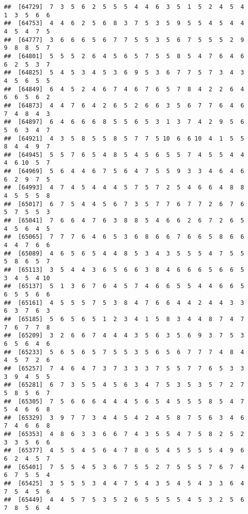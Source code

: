 \documentclass[
]{book}
\begin{document}
\begin{verbatim}
##  [64729]  7  3  5  6  2  5  5  5  4  4  6  3  5  1  5  2  4  5  4  1  3  5  6  6
##  [64753]  4  4  6  2  5  6  8  3  7  5  3  5  9  5  5  4  5  4  4  4  5  4  7  5
##  [64777]  3  6  6  6  5  6  7  7  5  5  3  5  6  7  5  5  5  2  9  9  8  8  5  7
##  [64801]  5  5  5  2  6  4  5  6  5  7  5  5  8  5  4  7  6  4  6  6  2  5  3  7
##  [64825]  5  4  5  3  4  5  3  6  9  5  3  6  7  7  5  7  3  4  3  4  5  6  5  5
##  [64849]  6  4  5  2  4  6  7  4  6  7  6  5  7  8  4  2  2  6  4  6  6  5  6  2
##  [64873]  4  4  7  6  4  2  6  5  2  6  6  3  5  6  7  7  6  4  6  7  4  8  4  3
##  [64897]  6  4  6  6  6  8  5  5  6  5  3  1  3  7  4  2  9  5  6  5  6  3  4  7
##  [64921]  4  3  5  8  5  5  8  5  7  7  5 10  6  6 10  4  1  5  5  8  4  4  9  7
##  [64945]  5  5  7  6  5  4  8  5  4  5  6  5  5  7  4  5  5  4  4  4  6 10  5  7
##  [64969]  5  6  4  4  6  7  5  6  4  7  5  5  9  3  3  4  6  4  6  6  2  9  7  5
##  [64993]  4  7  4  5  4  4  4  5  7  5  7  2  5  4  6  6  4  8  8  4  5  5  5  8
##  [65017]  6  7  5  4  4  5  6  7  3  5  7  7  6  7  7  2  6  7  6  5  7  5  5  3
##  [65041]  7  6  6  4  7  6  3  8  8  5  4  6  6  2  6  7  2  6  5  4  5  6  4  5
##  [65065]  7  7  7  6  4  6  5  3  6  8  6  6  7  6  6  5  8  6  6  4  4  7  6  6
##  [65089]  4  6  5  6  5  4  4  8  5  3  4  3  5  5  5  4  7  5  5  5  8  6  5  7
##  [65113]  3  5  4  4  3  6  5  6  6  3  8  4  6  6  6  5  6  6  5  3  4  5  4 10
##  [65137]  5  1  3  6  7  6  4  5  7  4  6  6  5  5  4  4  6  6  5  6  5  5  6  6
##  [65161]  4  5  5  5  7  5  3  8  4  7  6  6  4  4  2  4  4  3  3  6  3  7  6  3
##  [65185]  5  6  5  6  5  1  2  3  4  1  5  8  3  4  4  8  7  4  7  7  6  7  7  8
##  [65209]  3  2  6  6  7  4  4  4  3  5  6  3  5  6  9  3  7  5  3  6  5  6  4  6
##  [65233]  5  6  5  6  5  7  5  5  3  5  6  5  6  7  7  7  4  8  4  4  5  7  2  6
##  [65257]  7  4  6  4  7  3  7  3  3  3  7  5  5  7  7  6  5  3  3  3  9  4  5  5
##  [65281]  6  7  3  5  5  4  5  6  3  4  7  5  3  5  3  5  7  2  7  5  8  5  6  7
##  [65305]  7  5  6  6  6  4  4  4  5  6  5  4  5  5  5  8  5  4  7  5  4  6  6  8
##  [65329]  3  9  7  7  3  4  4  5  4  2  4  5  8  7  5  6  3  4  6  7  4  6  6  8
##  [65353]  4  8  6  3  3  6  6  7  4  3  5  5  4  7  5  8  2  5  2  3  3  5  6  6
##  [65377]  4  5  5  4  5  6  4  7  8  6  5  4  5  5  5  5  4  9  6  6  2  4  5  7
##  [65401]  7  5  5  4  5  3  6  7  5  5  2  7  5  5  5  7  6  7  4  6  7  5  5  4
##  [65425]  3  5  5  5  3  4  4  7  5  4  3  5  4  5  4  3  3  6  4  7  5  4  5  6
##  [65449]  4  4  5  7  5  3  5  2  6  5  5  5  5  4  5  3  2  5  6  7  8  5  6  4

\end{verbatim}
\end{document}
